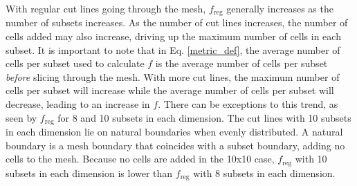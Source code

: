 With regular cut lines going through the mesh, $f_\text{reg}$ generally increases as the number of subsets increases.
As the number of cut lines increases, the number of cells added may also increase, driving up the maximum number of cells in each subset. It is important to note that in Eq. \ref{metric_def}, the average number of cells per subset used to calculate $f$ is the average number of cells per subset \textit{before} slicing through the mesh.
With more cut lines, the maximum number of cells per subset will increase while the average number of cells per subset will decrease, leading to an increase in $f$. There can be exceptions to this trend, as seen by ${f_\text{reg}}$ for 8 and 10 subsets in each dimension.
The cut lines with 10 subsets in each dimension lie on natural boundaries when evenly distributed.
A natural boundary is a mesh boundary that coincides with a subset boundary, adding no cells to the mesh.
Because no cells are added in the 10x10 case, $f_{\text{reg}}$ with 10 subsets in each dimension is lower than $f_{\text{reg}}$ with 8 subsets in each dimension.

